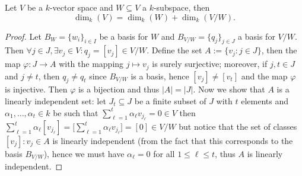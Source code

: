 \begin{lemma}\label{lem: rank plus nullity lemma}
  Let \(V\) be a \(k\)-vector space and \(W \subseteq V\) a \(k\)-subspace, then
  \[
    \dim_k(V) = \dim_k(W) + \dim_k(V/W).
  \]
\end{lemma}

\begin{proof}
  Let \(B_W = \{w_i\}_{i \in I}\) be a basis for \(W\) and  \(B_{V/W} =
  \{q_j\}_{j \in J}\) a basis for \(V/W\). Then \(\forall j \in J, \exists v_j
  \in V : q_j = [v_j] \in V/W\). Define the set \(A := \{v_j : j \in J\}\),
  then the map \(\varphi : J \to A\) with the mapping \(j \mapsto v_j\) is
  surely surjective; moreover, if \(j, t \in J\) and  \(j \neq t\), then \(q_j
  \neq q_t\) since \(B_{V/W}\) is a basis, hence \([v_j] \neq [v_t]\) and the
  map \(\varphi\) is injective. Then \(\varphi\) is a bijection and thus \(|A| =
  |J|\). Now we show that \(A\) is a linearly independent set: let \(J_t
  \subseteq J\) be a finite subset of \(J\) with \(t\) elements and \(\alpha_1,
  \dots, \alpha_t \in k\) be such that \(\sum_{\ell=1}^t \alpha_\ell v_{j_\ell}
  = 0 \in V\) then \(\sum_{\ell=1}^t \alpha_\ell [v_{j_\ell}] = \big[
  \sum_{\ell=1}^t \alpha_\ell v_{j_\ell} \big] = [0] \in V/W\) but notice that
  the set of classes \([v_j] : v_j \in A\) is linearly independent (from the
  fact that this corresponds to the basis \(B_{V/W}\)), hence we must have
  \(\alpha_\ell = 0\) for all \(1 \leq \ell \leq t\), thus \(A\) is linearly
  independent.


\end{proof}
